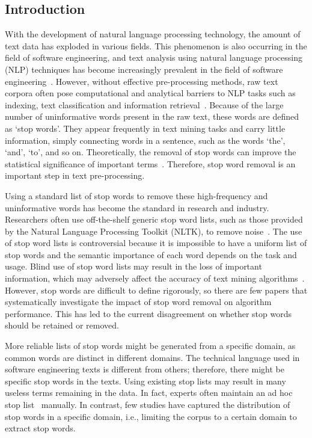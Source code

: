 \documentclass[conference]{IEEEtran}
\begin{document}
\begin{sloppy}
\section{Introduction}

With the development of natural language processing technology, the amount of text data has exploded in various fields. This phenomenon is also occurring in the field of software engineering, and text analysis using natural language processing (NLP) techniques has become increasingly prevalent in the field of software engineering~\cite{murphy2014function, glier2014exploring}. However, without effective pre-processing methods, raw text corpora often pose computational and analytical barriers to NLP tasks such as indexing, text classification and information retrieval~\cite{kaur2018systematic}. Because of the large number of uninformative words present in the raw text, these words are defined as `stop words'. They appear frequently in text mining tasks and carry little information, simply connecting words in a sentence, such as the words `the', `and', `to', and so on. Theoretically, the removal of stop words can improve the statistical significance of important terms~\cite{manco2002towards, choy2012effective}. Therefore, stop word removal is an important step in text pre-processing. 
 
Using a standard list of stop words to remove these high-frequency and uninformative words has become the standard in research and industry. Researchers often use off-the-shelf generic stop word lists, such as those provided by the Natural Language Processing Toolkit (NLTK), to remove noise~\cite{bird2009natural}. The use of stop word lists is controversial because it is impossible to have a uniform list of stop words and the semantic importance of each word depends on the task and usage. Blind use of stop word lists may result in the loss of important information, which may adversely affect the accuracy of text mining algorithms~\cite{sinka2003towards, makrehchi2008automatic}. However, stop words are difficult to define rigorously, so there are few papers that systematically investigate the impact of stop word removal on algorithm performance. This has led to the current disagreement on whether stop words should be retained or removed. 
 
More reliable lists of stop words might be generated from a specific domain, as common words are distinct in different domains. The technical language used in software engineering texts is different from others; therefore, there might be specific stop words in the texts. Using existing stop lists may result in many useless terms remaining in the data. In fact, experts often maintain an ad hoc stop list~\cite{sarica2020technet, seki2005application} manually. In contrast, few studies have captured the distribution of stop words in a specific domain, i.e., limiting the corpus to a certain domain to extract stop words. 


\end{sloppy}
\end{document}
